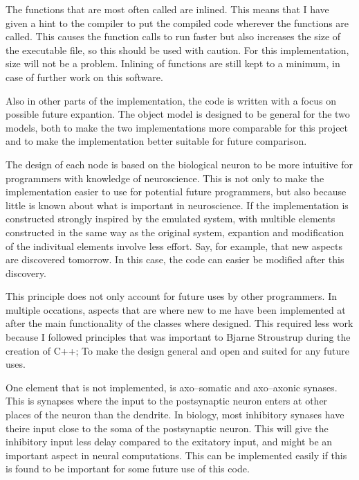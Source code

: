 The functions that are most often called are inlined. This means that I have given a hint to the compiler to put the compiled code wherever the functions are called.
This causes the function calls to run faster but also increases the size of the executable file, so this should be used with caution. %
For this implementation, size will not be a problem. %
Inlining of functions are still kept to a minimum, in case of further work on this software. %

Also in other parts of the implementation, the code is written with a focus on possible future expantion.
The object model is designed to be general for the two models, both to make the two implementations more comparable for this project and to make the implementation better suitable for future comparison.

The design of each node is based on the biological neuron to be more intuitive for programmers with knowledge of neuroscience. 
This is not only to make the implementation easier to use for potential future programmers, but also because little is known about what is important in neuroscience.
If the implementation is constructed strongly inspired by the emulated system, with multible elements constructed in the same way as the original system, expantion and modification of the indivitual elements involve less effort.
Say, for example, that new aspects are discovered tomorrow. In this case, the code can easier be modified after this discovery.

This principle does not only account for future uses by other programmers.
In multiple occations, aspects that are where new to me have been implemented at after the main functionality of the classes where designed. 
This required less work because I followed principles that was important to Bjarne Stroustrup during the creation of C++; To make the design general and open and suited for any future uses.%


One element that is not implemented, is axo--somatic and axo--axonic synases. 
This is synapses where the input to the postsynaptic neuron enters at other places of the neuron than the dendrite. 
In biology, most inhibitory synases have theire input close to the soma of the postsynaptic neuron. 
This will give the inhibitory input less delay compared to the exitatory input, and might be an important aspect in neural computations.
This can be implemented easily if this is found to be important for some future use of this code.

